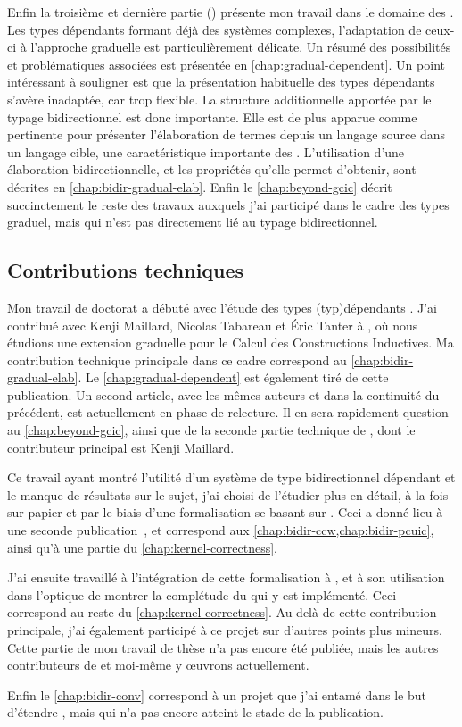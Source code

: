 Enfin la troisième et dernière partie ()
présente mon travail dans le domaine des .
Les types dépendants formant déjà des systèmes
complexes, l’adaptation de ceux-ci à l’approche graduelle est particulièrement
délicate. Un résumé des possibilités et problématiques associées est présentée
en \cref{chap:gradual-dependent}.
Un point intéressant à souligner est que la présentation habituelle
des types dépendants s’avère inadaptée, car trop flexible.
La structure additionnelle apportée par le typage bidirectionnel est donc importante.
Elle est de plus apparue comme pertinente pour présenter
l’élaboration de termes depuis un langage source dans un langage cible, une
caractéristique importante des .
L’utilisation d’une élaboration bidirectionnelle, et les propriétés qu’elle
permet d’obtenir, sont décrites en \cref{chap:bidir-gradual-elab}.
Enfin le \cref{chap:beyond-gcic} décrit succinctement le reste des travaux auxquels
j’ai participé dans le cadre des types graduel, mais qui n’est pas directement lié
au typage bidirectionnel.

\subsection{Contributions techniques}

Mon travail de doctorat a débuté avec l’étude des types \kl(typ){dépendants} .
J’ai contribué avec Kenji Maillard, Nicolas Tabareau et Éric Tanter à
, où nous étudions une extension graduelle
pour le Calcul des Constructions Inductives. Ma contribution technique principale
dans ce cadre correspond au \cref{chap:bidir-gradual-elab}.
Le \cref{chap:gradual-dependent} est également tiré de cette publication.
Un second article, avec les mêmes auteurs et dans la continuité du précédent,
est actuellement en phase de relecture. Il en sera rapidement question au
\cref{chap:beyond-gcic}, ainsi que de la seconde partie technique de
\textcite{LennonBertrand2022}, dont le contributeur principal est Kenji Maillard.

Ce travail ayant montré l’utilité d’un système de type bidirectionnel dépendant
et le manque de résultats sur le sujet, j’ai choisi de l’étudier
plus en détail, à la fois sur papier et par le biais d’une
formalisation se basant sur .
Ceci a donné lieu à une seconde publication~,
et correspond aux \cref{chap:bidir-ccw,chap:bidir-pcuic}, ainsi qu’à une partie du
\cref{chap:kernel-correctness}.

J’ai ensuite travaillé à l’intégration de cette formalisation à
, et à son utilisation dans l’optique de montrer la complétude du 
qui y est implémenté. Ceci correspond au reste du \cref{chap:kernel-correctness}.
Au-delà de cette contribution principale,
j’ai également participé à ce projet sur d’autres points plus mineurs.
Cette partie de mon travail de thèse n’a pas encore été publiée, mais
les autres contributeurs de  et moi-même y œuvrons actuellement.

Enfin le \cref{chap:bidir-conv} correspond à un projet que j’ai entamé dans
le but d’étendre , mais qui n’a pas encore atteint le stade de la
publication.